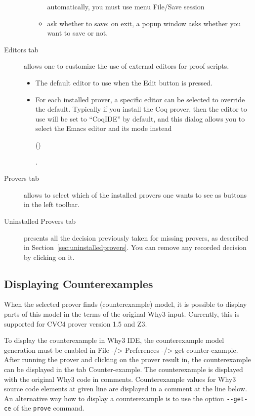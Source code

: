 \begin{description}
\begin{itemize}
\begin{itemize}
    automatically, you must use menu \textsf{File/Save session}
  \item ask whether to save: on exit, a popup window asks whether you
    want to save or not.
  \end{itemize}
\end{itemize}
\item[\textsf{Editors} tab] allows one to customize the use
  of external editors for proof scripts.
\begin{itemize}
\item The default editor to use when the \textsf{Edit} button is
  pressed.
\item For each installed prover, a specific editor can be selected to
  override the default. Typically if you install the Coq prover, then
  the editor to use will be set to ``CoqIDE'' by default, and this
  dialog allows you to select the Emacs editor and its
  mode instead%
 \begin{latexonly} (\urlprfgen)\end{latexonly}.
\end{itemize}
\item[\textsf{Provers} tab]
  allows to select which of the installed provers one wants to see
  as buttons in the left toolbar.
\item[\textsf{Uninstalled Provers} tab] presents all the
  decision previously taken for missing provers, as described in
  Section~\ref{sec:uninstalledprovers}. You can remove any recorded
  decision by clicking on it.
\end{description}

\subsection{Displaying Counterexamples}

When the selected prover finds (counterexample) model, it is possible to
display parts of this model in the terms of the original Why3 input.
Currently, this is supported for CVC4 prover version 1.5 and Z3.

To display the counterexample in Why3 IDE, the counterexample model generation
must be enabled in File -/> Preferences -/> get
counter-example.
After running the prover and clicking on the prover result in, the
counterexample can be displayed in the tab
Counter-example.
The counterexample is displayed with the original Why3 code in comments.
Counterexample values for Why3 source code elements at given line are
displayed in a comment at the line below.
An alternative way how to display a counterexample is to use the option
\texttt{-{}-get-ce} of the \texttt{prove} command.

